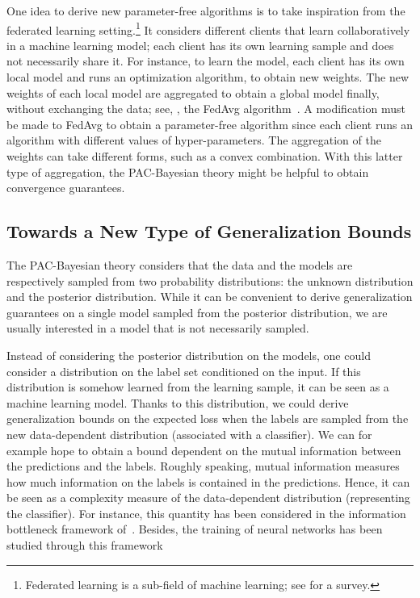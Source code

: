 One idea to derive new parameter-free algorithms is to take inspiration from the federated learning setting.\footnote{Federated learning is a sub-field of machine learning; see \citet{Kairouz2021} for a survey.}
It considers different clients that learn collaboratively in a machine learning model; each client has its own learning sample and does not necessarily share it.
For instance, to learn the model, each client has its own local model and runs an optimization algorithm, to obtain new weights.
The new weights of each local model are aggregated to obtain a global model finally, without exchanging the data; see, \eg, the FedAvg algorithm~\citep[see][]{McMahanMooreRamageHampsonArcas2017}.
A modification must be made to FedAvg to obtain a parameter-free algorithm since each client runs an algorithm with different values of hyper-parameters. 
The aggregation of the weights can take different forms, such as a convex combination. 
With this latter type of aggregation, the PAC-Bayesian theory might be helpful to obtain convergence guarantees.

\subsection*{Towards a New Type of Generalization Bounds}

The PAC-Bayesian theory considers that the data and the models are respectively sampled from two probability distributions: the unknown distribution and the posterior distribution.
While it can be convenient to derive generalization guarantees on a single model sampled from the posterior distribution, we are usually interested in a model that is not necessarily sampled.

Instead of considering the posterior distribution on the models, one could consider a distribution on the label set conditioned on the input.
If this distribution is somehow learned from the learning sample, it can be seen as a machine learning model.
Thanks to this distribution, we could derive generalization bounds on the expected loss when the labels are sampled from the new data-dependent distribution (associated with a classifier).
We can for example hope to obtain a bound dependent on the mutual information between the predictions and the labels.
Roughly speaking, mutual information measures how much information on the labels is contained in the predictions.
Hence, it can be seen as a complexity measure of the data-dependent distribution (representing the classifier).
For instance, this quantity has been considered in the information bottleneck framework of~\citet{TishbyPereiraBialek2000}.
Besides, the training of neural networks has been studied through this framework~\citep[see][]{ShwartzZivTishby2017}\pokeball